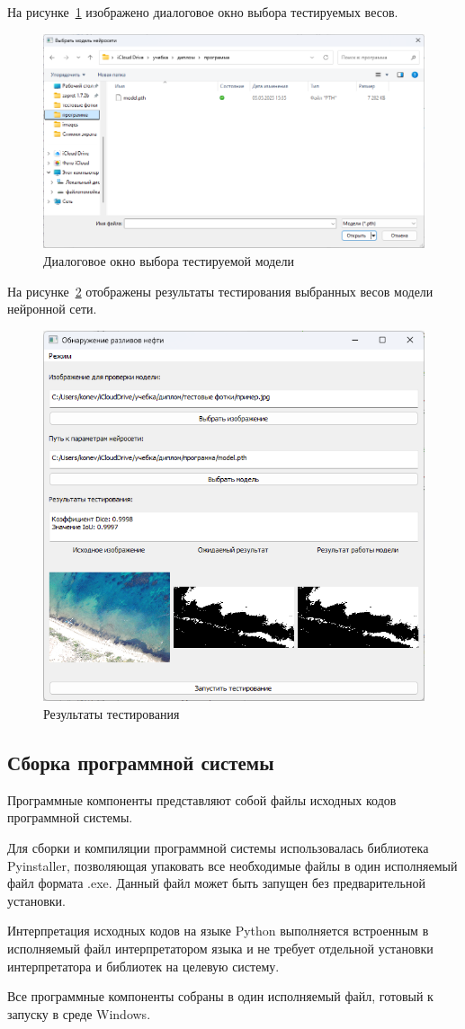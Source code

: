 На рисунке~\ref{fig:test_model_select} изображено диалоговое окно выбора тестируемых весов.
\begin{figure}[H]
	\centering
	\includegraphics[width=0.7\linewidth]{"images/выбор тестовой модели"}
	\caption{Диалоговое окно выбора тестируемой модели}
	\label{fig:test_model_select}
\end{figure}

На рисунке~\ref{fig:test_results_show} отображены результаты тестирования выбранных весов модели нейронной сети.
\begin{figure}[H]
	\centering
	\includegraphics[width=0.7\linewidth]{"images/результаты теста"}
	\caption{Результаты тестирования}
	\label{fig:test_results_show}
\end{figure}

\subsection{Сборка программной системы}

Программные компоненты представляют собой файлы исходных кодов программной системы.

Для сборки и компиляции программной системы использовалась библиотека Pyinstaller\cite{vasiliev-python}, позволяющая упаковать все необходимые файлы в один исполняемый файл формата .exe. Данный файл может быть запущен без предварительной установки.

Интерпретация исходных кодов на языке Python выполняется встроенным в исполняемый файл интерпретатором языка и не требует отдельной установки интерпретатора и библиотек на целевую систему.

Все программные компоненты собраны в один исполняемый файл, готовый к запуску в среде Windows.
